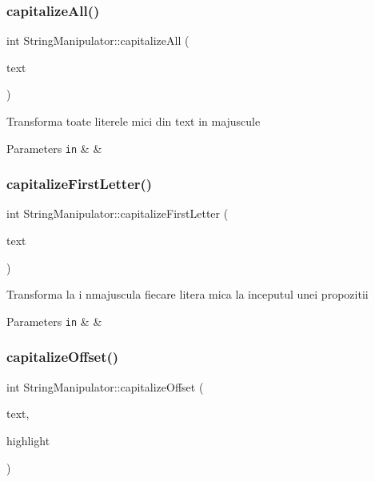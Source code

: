 \subsubsection{\texorpdfstring{capitalize\+All()}{capitalizeAll()}}
{\footnotesize\ttfamily int String\+Manipulator\+::capitalize\+All (\begin{DoxyParamCaption}\item[{Q\+String \&}]{text }\end{DoxyParamCaption})\hspace{0.3cm}{\ttfamily [static]}}

Transforma toate literele mici din text in majuscule


\begin{DoxyParams}[1]{Parameters}
\mbox{\tt in}  & {\em } & \\
\hline
\end{DoxyParams}
\mbox{\label{class_string_manipulator_a0dddee858bb0c58c63fd122645114bcb}} 
\subsubsection{\texorpdfstring{capitalize\+First\+Letter()}{capitalizeFirstLetter()}}
{\footnotesize\ttfamily int String\+Manipulator\+::capitalize\+First\+Letter (\begin{DoxyParamCaption}\item[{Q\+String \&}]{text }\end{DoxyParamCaption})\hspace{0.3cm}{\ttfamily [static]}}

Transforma la i nmajuscula fiecare litera mica la inceputul unei propozitii


\begin{DoxyParams}[1]{Parameters}
\mbox{\tt in}  & {\em } & \\
\hline
\end{DoxyParams}
\mbox{\label{class_string_manipulator_a236181c606edff1c577a9a88ddb8d7d9}} 
\subsubsection{\texorpdfstring{capitalize\+Offset()}{capitalizeOffset()}}
{\footnotesize\ttfamily int String\+Manipulator\+::capitalize\+Offset (\begin{DoxyParamCaption}\item[{Q\+String \&}]{text,  }\item[{const \hyperlink{class_text_high_light}{Text\+High\+Light}}]{highlight }\end{DoxyParamCaption})\hspace{0.3cm}{\ttfamily [static]}}

